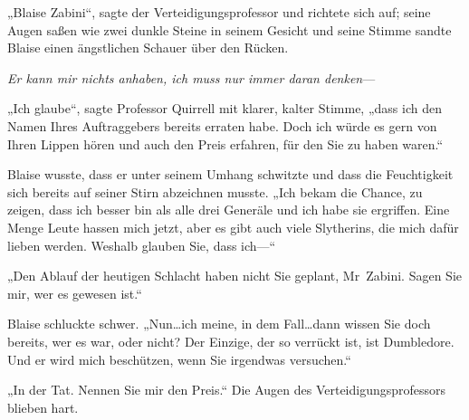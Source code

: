 „Blaise Zabini“, sagte der Verteidigungsprofessor und richtete sich auf; seine Augen saßen wie zwei dunkle Steine in seinem Gesicht und seine Stimme sandte Blaise einen ängstlichen Schauer über den Rücken.

\emph{Er kann mir nichts anhaben, ich muss nur immer daran denken}—

„Ich glaube“, sagte Professor Quirrell mit klarer, kalter Stimme, „dass ich den Namen Ihres Auftraggebers bereits erraten habe. Doch ich würde es gern von Ihren Lippen hören und auch den Preis erfahren, für den Sie zu haben waren.“

Blaise wusste, dass er unter seinem Umhang schwitzte und dass die Feuchtigkeit sich bereits auf seiner Stirn abzeichnen musste. „Ich bekam die Chance, zu zeigen, dass ich besser bin als alle drei Generäle und ich habe sie ergriffen. Eine Menge Leute hassen mich jetzt, aber es gibt auch viele Slytherins, die mich dafür lieben werden. Weshalb glauben Sie, dass ich—“

„Den Ablauf der heutigen Schlacht haben nicht Sie geplant, Mr~Zabini. Sagen Sie mir, wer es gewesen ist.“

Blaise schluckte schwer. „Nun…ich meine, in dem Fall…dann wissen Sie doch bereits, wer es war, oder nicht? Der Einzige, der so verrückt ist, ist Dumbledore. Und er wird mich beschützen, wenn Sie irgendwas versuchen.“

„In der Tat. Nennen Sie mir den Preis.“ Die Augen des Verteidigungsprofessors blieben hart.

